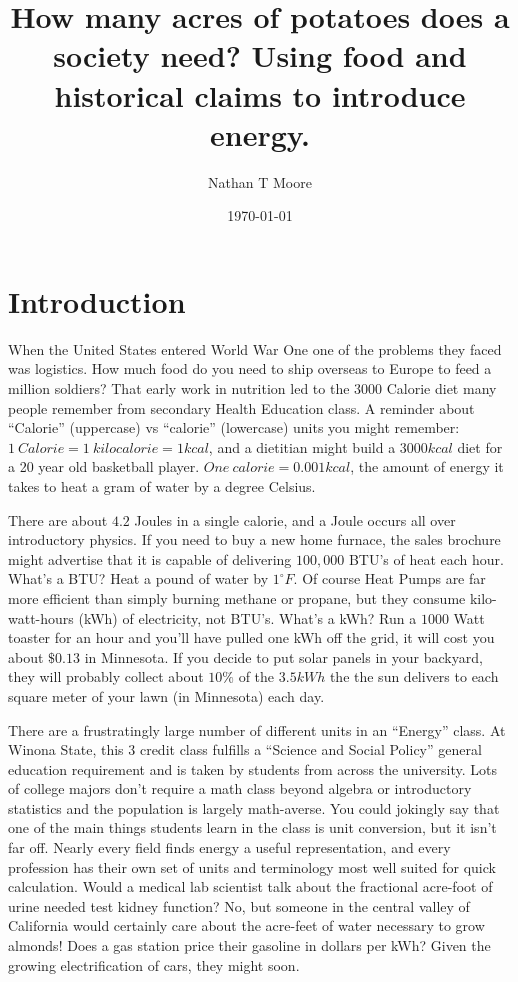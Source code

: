 \documentclass[onecolumn]{article}
\begin{document}
\title{How many acres of potatoes does a society need? Using food and historical claims to introduce energy.}
\author{Nathan T Moore}
\date{\today}
\maketitle

\section{Introduction}
When the United States entered World War One one of the problems they faced was logistics.  How much food do you need to ship overseas to Europe to feed a million soldiers?  That early work in nutrition led to the $3000$ Calorie diet many people remember from secondary Health Education class.  A reminder about ``Calorie'' (uppercase) vs ``calorie'' (lowercase) units you might remember: $1~Calorie = 1~kilocalorie=1 kcal$, and a dietitian might build a $3000 kcal$ diet for a 20 year old basketball player. $One~ calorie = 0.001kcal$, the amount of energy it takes  to heat a gram of water by a degree Celsius. 

There are about $4.2$ Joules in a single calorie, and a Joule occurs all over introductory  physics.  If you need to buy a new home furnace, the sales brochure might advertise that it is capable of delivering $100,000$ BTU's of heat each hour.  What's a BTU? Heat a pound of water by $1^{\circ}F$.  Of course Heat Pumps are far more efficient than simply burning methane or propane, but they consume kilo-watt-hours (kWh) of electricity, not BTU's.  What's a kWh?  Run a $1000$ Watt toaster for an hour and you'll have pulled one kWh off the grid, it will cost you about $\$0.13$ in Minnesota.  If you decide to put solar panels in your backyard, they will probably collect about $10\%$ of the $3.5kWh$ the  the sun delivers to each square meter of your lawn (in Minnesota) each day.  

There are a frustratingly large number of different units in an ``Energy'' class.  At Winona State, this 3 credit class \cite{Energy_textbook,PFFP} fulfills a ``Science and Social Policy'' general education requirement and is taken by students from across the university.   Lots of college majors don't require a math class beyond algebra or introductory statistics and the population is largely math-averse. 
You could jokingly say that one of the main things students learn in the class is unit conversion, but it isn't far off.  
Nearly every field finds energy a useful representation, and every profession has their own set of units and terminology most well suited for quick calculation.  Would a medical lab scientist talk about the fractional acre-foot of urine needed test kidney function?  No, but someone in the central valley of California would certainly care about the acre-feet of water necessary to grow almonds!  
Does a gas station price their gasoline in dollars per kWh? Given the growing electrification of cars, they might soon.
\end{document}
